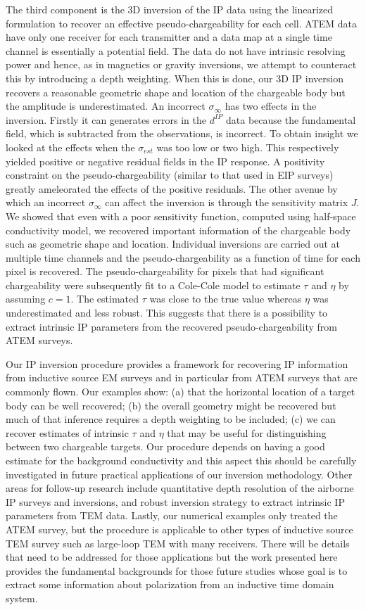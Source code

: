 \documentclass[extra,mreferee]{gji}
\newcommand{\siginf}{\sigma_\infty}
\begin{document}
The third component is the 3D inversion of the IP data using the linearized formulation to recover an effective pseudo-chargeability for each cell. ATEM data have only one receiver for each transmitter and a data map at a single time channel is essentially a potential field. The data do not have intrinsic resolving power and hence, as in magnetics or gravity inversions, we attempt to counteract this by introducing a depth weighting.  When this is done, our 3D IP inversion recovers a reasonable geometric shape and location of the chargeable body but the amplitude is underestimated. An incorrect $\siginf$ has two effects in the inversion. Firstly it can generates errors in the $d^{IP}$ data because the fundamental field, which is subtracted from the observations, is incorrect. To obtain insight we looked at the effects when the $\sigma_{est}$ was too low or two high. This respectively yielded positive or negative residual fields in the IP response. A positivity constraint on the pseudo-chargeability (similar to that used in EIP surveys) greatly ameleorated the effects of the positive residuals. The other avenue by which an incorrect $\siginf$ can affect the inversion is through the sensitivity matrix $J$. We showed that even with a poor sensitivity function, computed using half-space conductivity model, we recovered important information of the chargeable body such as geometric shape and location. Individual inversions are carried out at multiple time channels and the pseudo-chargeability as a function of time for each pixel is recovered. The pseudo-chargeability for pixels that had significant chargeability were subsequently fit to a Cole-Cole model to estimate $\tau$ and $\eta$ by assuming $c=1$. The estimated $\tau$ was close to the true value whereas $\eta$ was underestimated and less robust. This suggests that there is a possibility to extract intrinsic IP parameters from the recovered pseudo-chargeability from ATEM surveys.  

Our IP inversion procedure provides a framework for recovering IP information from inductive source EM surveys and in particular from ATEM surveys that are commonly flown. Our examples show: (a)  that the horizontal location of a target body can be well recovered; (b) the overall geometry might be recovered but much of that inference requires a depth weighting to be included; (c)  we can recover estimates of intrinsic $\tau$ and $\eta$ that may be useful for distinguishing between two chargeable targets. Our procedure depends on having a good estimate for the background conductivity and this aspect this should be carefully investigated in future practical applications of our inversion methodology.  Other areas for follow-up research include quantitative depth resolution of the airborne IP surveys and inversions, and robust inversion strategy to extract intrinsic IP parameters from TEM data. 
Lastly, our numerical examples  only treated the ATEM survey, but the procedure is applicable to other types of inductive source TEM survey such as large-loop TEM with many receivers. There will be details that need to be addressed for those applications but the work presented here provides the  fundamental backgrounds for those future studies whose goal is to extract some information about polarization from an inductive time domain system. 
\end{document}
